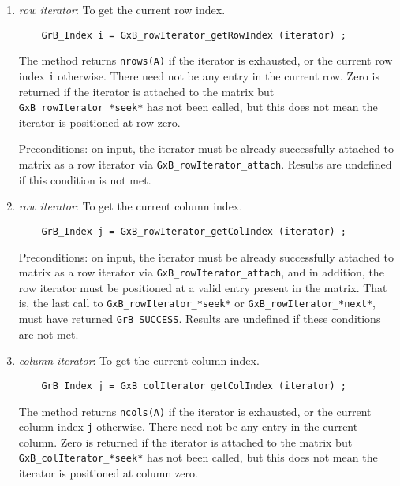 \documentclass[12pt]{article}
\begin{document}
    \begin{enumerate}
    \item {\em row iterator}:  To get the current row index.
    {\footnotesize
    \begin{verbatim}
    GrB_Index i = GxB_rowIterator_getRowIndex (iterator) ; \end{verbatim}}

    The method returns \verb'nrows(A)' if the iterator is exhausted, or the
    current row index \verb'i' otherwise.  There need not be any entry in the
    current row.  Zero is returned if the iterator is attached to the matrix
    but \verb'GxB_rowIterator_*seek*' has not been called, but this does not
    mean the iterator is positioned at row zero.

    Preconditions: on input, the iterator must be already successfully attached
    to matrix as a row iterator via \verb'GxB_rowIterator_attach'.
    Results are undefined if this condition is not met.

    \item {\em row iterator}:  To get the current column index.
    {\footnotesize
    \begin{verbatim}
    GrB_Index j = GxB_rowIterator_getColIndex (iterator) ; \end{verbatim}}

    Preconditions: on input, the iterator must be already successfully attached
    to matrix as a row iterator via \verb'GxB_rowIterator_attach', and in
    addition, the row iterator must be positioned at a valid entry present in
    the matrix.  That is, the last call to \verb'GxB_rowIterator_*seek*' or
    \verb'GxB_rowIterator_*next*', must have returned \verb'GrB_SUCCESS'.
    Results are undefined if these conditions are not met.

    \item {\em column iterator}:  To get the current column index.
    {\footnotesize
    \begin{verbatim}
    GrB_Index j = GxB_colIterator_getColIndex (iterator) ; \end{verbatim}}

    The method returns \verb'ncols(A)' if the iterator is exhausted, or the
    current column index \verb'j' otherwise.  There need not be any entry in the
    current column.  Zero is returned if the iterator is attached to the matrix
    but \verb'GxB_colIterator_*seek*' has not been called, but this does not
    mean the iterator is positioned at column zero.


\end{enumerate}
\end{document}
